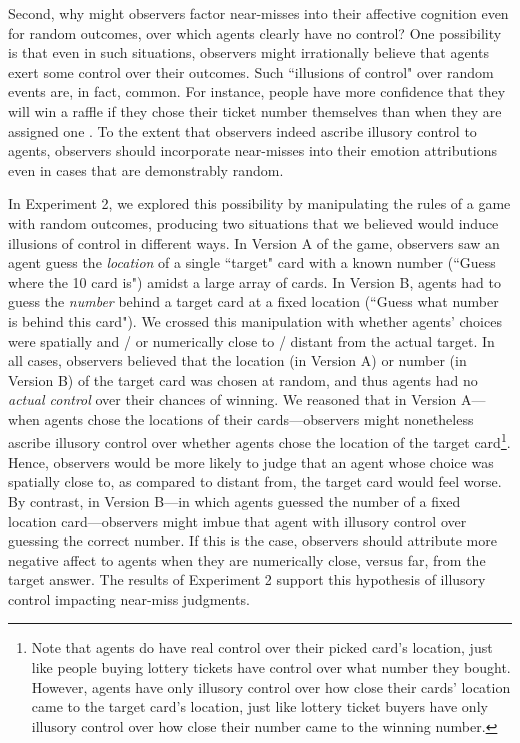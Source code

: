 \documentclass[10pt,letterpaper]{article}
\begin{document}
	Second, why might observers factor near-misses into their affective cognition even for random outcomes, over which agents clearly have no control? One possibility is that even in such situations, observers might irrationally believe that agents exert some control over their outcomes.  Such ``illusions of control" over random events are, in fact, common. For instance, people have more confidence that they will win a raffle if they chose their ticket number themselves than when they are assigned one \cite{Langer1975, Taylor1988}. To the extent that observers indeed ascribe illusory control to agents, observers should incorporate near-misses into their emotion attributions even in cases that are demonstrably random.  

	
	In Experiment 2, we explored this possibility by manipulating the rules of a game with random outcomes, producing two situations that we believed would induce illusions of control in different ways. In Version A of the game, observers saw an agent guess the \textit{location} of a single ``target" card with a known number (``Guess where the 10 card is") amidst a large array of cards. In Version B, agents had to guess the \textit{number} behind a target card at a fixed location (``Guess what number is behind this card"). We crossed this manipulation with whether agents' choices were spatially and / or numerically close to / distant from the actual target. In all cases, observers believed that the location (in Version A) or number (in Version B) of the target card was chosen at random, and thus agents had no \textit{actual control} over their chances of winning. We reasoned that in Version A---when agents chose the locations of their cards---observers might nonetheless ascribe illusory control over whether agents chose the location of the target card\footnote{Note that agents do have real control over their picked card's location, just like people buying lottery tickets have control over what number they bought. However, agents have only illusory control over how close their cards' location came to the target card's location, just like lottery ticket buyers have only illusory control over how close their number came to the winning number.}. Hence, observers would be more likely to judge that an agent whose choice was spatially close to, as compared to distant from, the target card would feel worse.  By contrast, in Version B---in which agents guessed the number of a fixed location card---observers might imbue that agent with illusory control over guessing the correct number. If this is the case, observers should attribute more negative affect to agents when they are numerically close, versus far, from the target answer. The results of Experiment 2 support this hypothesis of illusory control impacting near-miss judgments.
\end{document}
